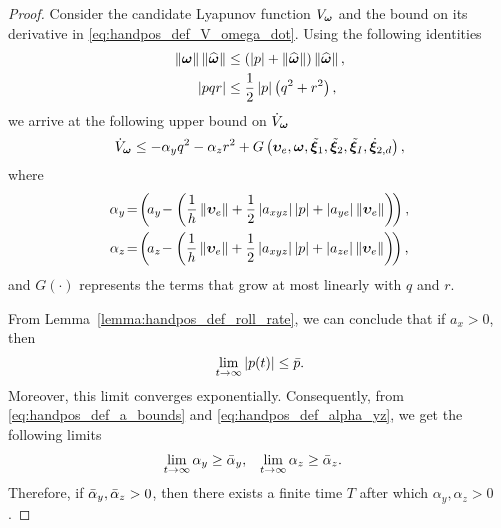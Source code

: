 \begin{proof}
    Consider the candidate Lyapunov function $V_{\bm{\omega}}$ and the bound on its derivative in \eqref{eq:handpos_def_V_omega_dot}.
    Using the following identities
    \begin{subequations}
    \begin{align}
        \left\|\bm{\omega}\right\|\left\|\widehat{\bm{\omega}}\right\| &\leq \left(\left|p\right| + \left\|\widehat{\bm{\omega}}\right\|\right)\left\|\widehat{\bm{\omega}}\right\|, \\
        \left|pqr\right| &\leq \frac{1}{2}\left|p\right|\left(q^2 + r^2\right),
    \end{align}
    \end{subequations}
    we arrive at the following upper bound on $\dot{V}_{\bm{\omega}}$
    \begin{equation}
            \dot{V}_{\bm{\omega}} \leq -\alpha_yq^2 - \alpha_zr^2 + G\left(\bm{\upsilon}_e, \bm{\omega}, \tilde{\bm{\xi}}_1, \tilde{\bm{\xi}}_2, \tilde{\bm{\xi}}_I, \dot{\bm{\xi}}_{2, d}\right),
            \label{eq:handpos_def_V_omega_dot_strict}
    \end{equation}
    where
    \begin{subequations}
        \begin{align}
            \alpha_y\! &=\! \left(\!a_y \!- \left(\frac{1}{h}\norm{\bvel_e} + \frac{1}{2}\abs{a_{xyz}}\abs{p} + \abs{a_{ye}}\norm{\bvel_e}\right)\!\right), \\
            \alpha_z\! &=\! \left(\!a_z \!- \left(\frac{1}{h}\norm{\bvel_e} + \frac{1}{2}\abs{a_{xyz}}\abs{p} + \abs{a_{ze}}\norm{\bvel_e}\right)\!\right),
        \end{align} \label{eq:handpos_def_alpha_yz}
    \end{subequations}
    and $G(\cdot)$ represents the terms that grow at most linearly with $q$ and $r$.

    From Lemma~\ref{lemma:handpos_def_roll_rate}, we can conclude that if $a_x > 0$, then
    \begin{equation}
        \lim_{t \rightarrow \infty} \left|p(t)\right| \leq \Bar{p}.
    \end{equation}
    Moreover, this limit converges exponentially.
    Consequently, from \eqref{eq:handpos_def_a_bounds} and \eqref{eq:handpos_def_alpha_yz}, we get the following limits
    \begin{align}
        \lim_{t \rightarrow \infty} \alpha_y &\geq \Bar{\alpha}_y, &
        \lim_{t \rightarrow \infty} \alpha_z &\geq \Bar{\alpha}_z.
    \end{align}
    Therefore, if $\Bar{\alpha}_y, \Bar{\alpha}_z > 0$, then there exists a finite time $T$ after which $\alpha_y, \alpha_z > 0$.


\end{proof}
